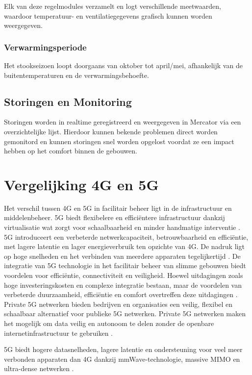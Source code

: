 Elk van deze regelmodules verzamelt en logt verschillende meetwaarden, waardoor temperatuur- en ventilatiegegevens grafisch kunnen worden weergegeven.

\subsubsection{Verwarmingsperiode}
Het stookseizoen loopt doorgaans van oktober tot april/mei, afhankelijk van de buitentemperaturen en de verwarmingsbehoefte.

\subsection{Storingen en Monitoring}
Storingen worden in realtime geregistreerd en weergegeven in Mercator via een overzichtelijke lijst. Hierdoor kunnen bekende problemen direct worden gemonitord en kunnen storingen snel worden opgelost voordat ze een impact hebben op het comfort binnen de gebouwen.

\section{Vergelijking 4G en 5G}
Het verschil tussen 4G en 5G in facilitair beheer ligt in de infrastructuur en middelenbeheer. 5G biedt flexibelere en efficiëntere infrastructuur dankzij virtualisatie wat zorgt voor schaalbaarheid en minder handmatige interventie \autocite{degambur2021resource}. 5G introduceert een verbeterde netwerkcapaciteit, betrouwbaarheid en efficiëntie, met lagere latentie en lager energieverbruik ten opzichte van 4G. De nadruk ligt op hoge snelheden en het verbinden van meerdere apparaten tegelijkertijd \autocite{mihret20214g}. De integratie van 5G technologie in het facilitair beheer van slimme gebouwen biedt voordelen voor efficiëntie, connectiviteit en veiligheid. Hoewel uitdagingen zoals hoge investeringskosten en complexe integratie bestaan, maar de voordelen van verbeterde duurzaamheid, efficiëntie en comfort overtreffen deze uitdagingen \autocite{Markogiannaki2023}. Private 5G netwerken bieden bedrijven en organisaties een veilig, flexibel en schaalbaar alternatief voor publieke 5G netwerken. Private 5G netwerken maken het mogelijk om data veilig en autonoom te delen zonder de openbare internetinfrastructuur te gebruiken \autocite{eswaran2023private}.

5G biedt hogere datasnelheden, lagere latentie en ondersteuning voor veel meer verbonden apparaten  dan 4G dankzij mmWave-technologie, massive MIMO en ultra-dense netwerken \autocite{Hui_2020}.


